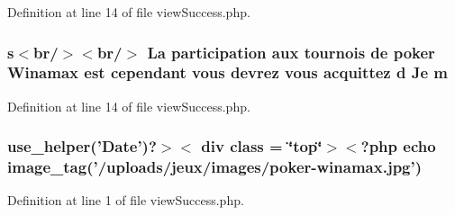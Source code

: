 Definition at line 14 of file view\-Success.\-php.

\hypertarget{frontend_2modules_2poker__tournament_2templates_2view_success_8php_a128ba33893be6a113de6d7895ff5d641}{
\subsubsection[{m}]{\setlength{\rightskip}{0pt plus 5cm}s$<$br/$>$$<$br/$>$ La participation aux tournois de poker Winamax est cependant vous devrez vous acquittez d Je m}}\label{frontend_2modules_2poker__tournament_2templates_2view_success_8php_a128ba33893be6a113de6d7895ff5d641}


Definition at line 14 of file view\-Success.\-php.

\hypertarget{frontend_2modules_2poker__tournament_2templates_2view_success_8php_af7021ad5f4c3d81ef96691bf68712c7a}{
\subsubsection[{use\-\_\-helper}]{\setlength{\rightskip}{0pt plus 5cm}use\-\_\-helper('Date')?$>$$<$ div {\bf class} = \char`\"{}top\char`\"{}$>$$<$?php echo image\-\_\-tag('/uploads/jeux/images/poker-\/winamax.\-jpg')}}\label{frontend_2modules_2poker__tournament_2templates_2view_success_8php_af7021ad5f4c3d81ef96691bf68712c7a}


Definition at line 1 of file view\-Success.\-php.

